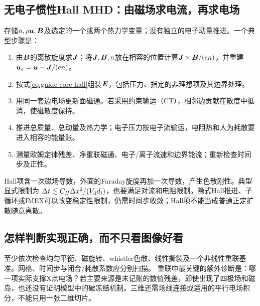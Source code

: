 \subsection{无电子惯性Hall MHD：由磁场求电流，再求电场}
存储$n,\rho\bm{u},\bm{B}$及选定的一个或两个热力学变量；没有独立的电子动量推进。一个典型步骤是：
\begin{enumerate}
\item 由$\bm{B}$的离散旋度求$\bm{J}$；将$\bm{J},\bm{B},n$放在相容的位置计算$\bm{J}\times\bm{B}/(en)$，并重建$\bm{u}_e=\bm{u}-\bm{J}/(en)$。
\item 按式\eqref{eq:guide-core-hall}组装$\bm{E}$，包括压力、指定的非理想项及其边界处理。
\item 用同一套边电场更新面磁通。若采用约束输运（CT），相邻边贡献在散度中抵消，使磁散度保持。
\item 推进总质量、总动量及热力学；电子压力按电子流输运，电阻热和人为耗散要进入相容的能量账。
\item 测量欧姆定律残差、净重联磁通、电子/离子流速和边界能流；重新检查时间步及正性。
\end{enumerate}
Hall项含一次磁场导数，外面的Faraday旋度再加一次导数，产生色散刚性。典型显式限制为
$\Delta t\lesssim C_H\Delta x^2/(V_{\!A} d_i)$，也要满足对流和电阻限制。隐式Hall推进、子循环或IMEX可以改变稳定性限制，仍需时间步收敛；Hall项不能当成普通正定扩散随意离散。\citep{Arnold2008,Toth2008}

\subsection{怎样判断实现正确，而不只看图像好看}
至少依次检查均匀平衡、磁旋转、whistler色散、线性撕裂及一个非线性重联基准。网格、时间步与闭合/耗散系数应分别扫描。
重联中最关键的额外诊断是：哪一项实际支撑X点电场？若主要来源是未记账的数值残差，即使出现了四极场和磁岛，也还没有证明模型中的破冻结机制。三维还需场线连接或适用的平行电场积分，不能只用一张二维切片。

